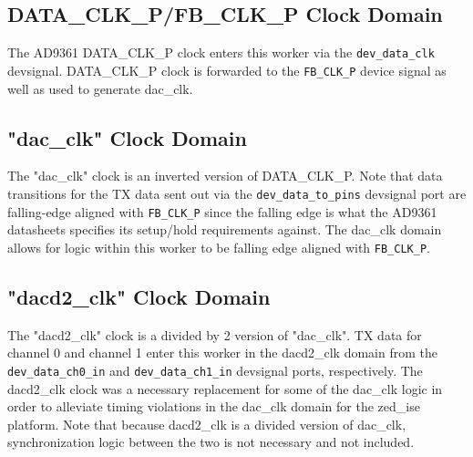\documentclass{article}
\begin{document}
\subsection*{DATA\_CLK\_P/FB\_CLK\_P Clock Domain}
The AD9361 DATA\_CLK\_P clock enters this worker via the \verb+dev_data_clk+ devsignal. DATA\_CLK\_P clock is forwarded to the \verb+FB_CLK_P+ device signal as well as used to generate dac\_clk.
\subsection*{"dac\_clk" Clock Domain}
The "dac\_clk" clock is an inverted version of DATA\_CLK\_P. Note that data transitions for the TX data sent out via the \verb+dev_data_to_pins+ devsignal port are falling-edge aligned with \verb+FB_CLK_P+ since the falling edge is what the AD9361 datasheets specifies its setup/hold requirements against\cite{adi_ug570}. The dac\_clk domain allows for logic within this worker to be falling edge aligned with \verb+FB_CLK_P+.
\subsection*{"dacd2\_clk" Clock Domain}
The "dacd2\_clk" clock is a divided by 2 version of "dac\_clk". TX data for channel 0 and channel 1 enter this worker in the dacd2\_clk domain from the  \verb+dev_data_ch0_in+ and \verb+dev_data_ch1_in+ devsignal ports, respectively. The dacd2\_clk clock was a necessary replacement for some of the dac\_clk logic in order to alleviate timing violations in the dac\_clk domain for the zed\_ise platform. Note that because dacd2\_clk is a divided version of dac\_clk, synchronization logic between the two is not necessary and not included.
\end{document}
